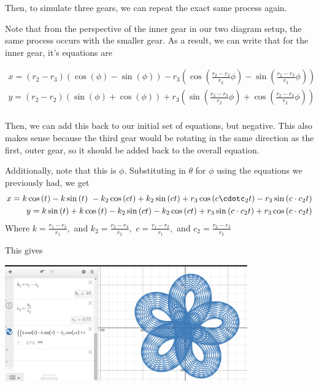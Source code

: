 \documentclass{article}
\theoremstyle{remark}
\theoremstyle{problem}
\numberwithin{problem}{subsection}
\numberwithin{Problem}{section}
\theoremstyle{definition}
\theoremstyle{definition}
\begin{document}
Then, to simulate three gears, we can repeat the exact same process again. 

Note that from the perspective of the inner gear in our two diagram setup, the same process occurs with the smaller gear. As a result, we can write that for the inner gear, it's equations are 

\begin{align*}
    x = (r_2 - r_3) (\cos(\phi) - \sin(\phi)) - r_3  \left( \cos\left(\frac{r_2 - r_3}{r_2}  \phi \right) - \sin\left(\frac{r_2 - r_3}{r_2}  \phi \right) \right) \\
    y = (r_2 - r_2) \left(\sin(\phi) + \cos(\phi) \right) + r_3 \left(\sin\left(\frac{r_2 - r_3}{r_2}  \phi \right) + \cos\left(\frac{r_2 - r_3}{r_2}  \phi \right) \right) \\
\end{align*}

Then, we can add this back to our initial set of equations, but negative. This also makes sense because the third gear would be rotating in the same direction as the first, outer gear, so it should be added back to the overall equation. 

Additionally, note that this is $\phi.$ Substituting in $\theta$ for $\phi$ using the equations we previously had, we get
\begin{align*}
x = k\cos\left(t\right)-k\sin\left(t\right)\ -k_{2}\cos\left(ct\right)+k_{2}\sin\left(ct\right) + r_{3}\cos\left(c \cdotc_{2}t\right)-r_{3}\sin\left(c \cdot c_{2}t\right) \\
y = k\sin\left(t\right)+k\cos\left(t\right) -k_{2}\sin\left(ct\right)-k_{2}\cos\left(ct\right)+r_{3}\sin\left(c \cdot c_{2}t\right)+r_{3}\cos\left(c\cdot c_{2}t\right) \\
\end{align*}
Where $k = \frac{r_1 - r_2}{r_1},$ and $k_2 = \frac{r_2 - r_3}{r_2},$ $c = \frac{r_1 - r_2}{r_1},$ and $c_2 = \frac{r_2 - r_3}{r_2}$

This gives

\begin{center}
\includegraphics[height=5cm]{images/3-Gear Spiro.png}
\end{center}
\end{document}
